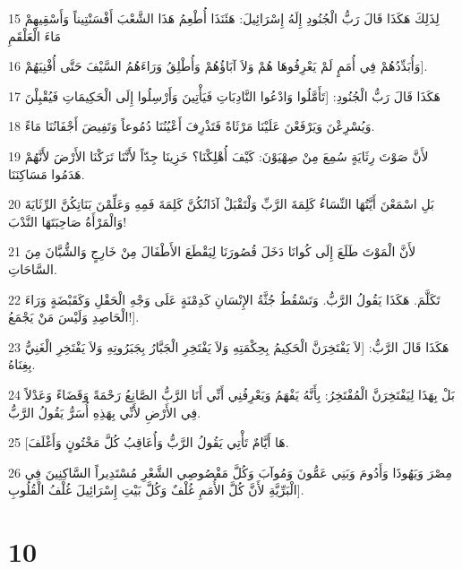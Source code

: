 \par 15 لِذَلِكَ هَكَذَا قَالَ رَبُّ الْجُنُودِ إِلَهُ إِسْرَائِيلَ: هَئَنَذَا أُطْعِمُ هَذَا الشَّعْبَ أَفْسَنْتِيناً وَأَسْقِيهِمْ مَاءَ الْعَلْقَمِ
\par 16 وَأُبَدِّدُهُمْ فِي أُمَمٍ لَمْ يَعْرِفُوهَا هُمْ وَلاَ آبَاؤُهُمْ وَأُطْلِقُ وَرَاءَهُمُ السَّيْفَ حَتَّى أُفْنِيَهُمْ].
\par 17 هَكَذَا قَالَ رَبُّ الْجُنُودِ: [تَأَمَّلُوا وَادْعُوا النَّادِبَاتِ فَيَأْتِينَ وَأَرْسِلُوا إِلَى الْحَكِيمَاتِ فَيُقْبِلْنَ
\par 18 وَيُسْرِعْنَ وَيَرْفَعْنَ عَلَيْنَا مَرْثَاةً فَتَذْرِفَ أَعْيُنُنَا دُمُوعاً وَتَفِيضَ أَجْفَانُنَا مَاءً.
\par 19 لأَنَّ صَوْتَ رِثَايَةٍ سُمِعَ مِنْ صِهْيَوْنَ: كَيْفَ أُهْلِكْنَا؟ خَزِينَا جِدّاً لأَنَّنَا تَرَكْنَا الأَرْضَ لأَنَّهُمْ هَدَمُوا مَسَاكِنَنَا.
\par 20 بَلِ اسْمَعْنَ أَيَّتُهَا النِّسَاءُ كَلِمَةَ الرَّبِّ وَلْتَقْبَلْ آذَانُكُنَّ كَلِمَةَ فَمِهِ وَعَلِّمْنَ بَنَاتِكُنَّ الرِّثَايَةَ وَالْمَرْأَةُ صَاحِبَتَهَا النَّدْبَ!
\par 21 لأَنَّ الْمَوْتَ طَلَعَ إِلَى كُوانَا دَخَلَ قُصُورَنَا لِيَقْطَعَ الأَطْفَالَ مِنْ خَارِجٍ وَالشُّبَّانَ مِنَ السَّاحَاتِ.
\par 22 تَكَلَّمَ. هَكَذَا يَقُولُ الرَّبُّ. وَتَسْقُطُ جُثَّةُ الإِنْسَانِ كَدِمْنَةٍ عَلَى وَجْهِ الْحَقْلِ وَكَقَبْضَةٍ وَرَاءَ الْحَاصِدِ وَلَيْسَ مَنْ يَجْمَعُ!].
\par 23 هَكَذَا قَالَ الرَّبُّ: [لاَ يَفْتَخِرَنَّ الْحَكِيمُ بِحِكْمَتِهِ وَلاَ يَفْتَخِرِ الْجَبَّارُ بِجَبَرُوتِهِ وَلاَ يَفْتَخِرِ الْغَنِيُّ بِغِنَاهُ.
\par 24 بَلْ بِهَذَا لِيَفْتَخِرَنَّ الْمُفْتَخِرُ: بِأَنَّهُ يَفْهَمُ وَيَعْرِفُنِي أَنِّي أَنَا الرَّبُّ الصَّانِعُ رَحْمَةً وَقَضَاءً وَعَدْلاً فِي الأَرْضِ لأَنِّي بِهَذِهِ أُسَرُّ يَقُولُ الرَّبُّ.
\par 25 [هَا أَيَّامٌ تَأْتِي يَقُولُ الرَّبُّ وَأُعَاقِبُ كُلَّ مَخْتُونٍ وَأَغْلَفَ.
\par 26 مِصْرَ وَيَهُوذَا وَأَدُومَ وَبَنِي عَمُّونَ وَمُوآبَ وَكُلَّ مَقْصُوصِي الشَّعْرِ مُسْتَدِيراً السَّاكِنِينَ فِي الْبَرِّيَّةِ لأَنَّ كُلَّ الأُمَمِ غُلْفٌ وَكُلَّ بَيْتِ إِسْرَائِيلَ غُلْفُ الْقُلُوبِ].

\chapter{10}

